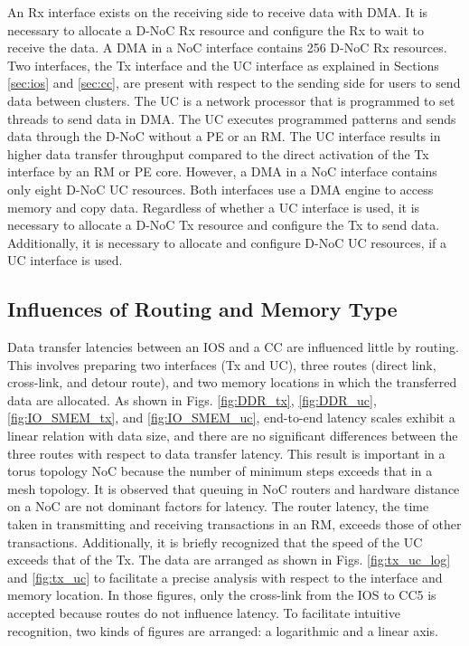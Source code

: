 An Rx interface exists on the receiving side to receive data with DMA.
It is necessary to allocate a D-NoC Rx resource and configure the Rx to wait to receive the data.
A DMA in a NoC interface contains 256 D-NoC Rx resources.
Two interfaces, the Tx interface and the UC interface as explained in Sections \ref{sec:ios} and \ref{sec:cc},
are present with respect to the sending side for users to send data between clusters.
The UC is a network processor that is programmed to set threads to send data in DMA.
The UC executes programmed patterns and sends data through the D-NoC without a PE or an RM.
The UC interface results in higher data transfer throughput compared to the direct activation of the Tx interface by an RM or PE core.
However, a DMA in a NoC interface contains only eight D-NoC UC resources.
Both interfaces use a DMA engine to access memory and copy data.
Regardless of whether a UC interface is used, it is necessary to allocate a D-NoC Tx resource and configure the Tx to send data.
Additionally, it is necessary to allocate and configure D-NoC UC resources, if a UC interface is used.

\subsection{Influences of Routing and Memory Type}
\label{sec:routing_and_memory}

Data transfer latencies between an IOS and a CC are influenced little by routing.
This involves preparing two interfaces (Tx and UC), three routes (direct link, cross-link, and detour route), and two memory locations in which the transferred data are allocated.
As shown in Figs. \ref{fig:DDR_tx}, \ref{fig:DDR_uc}, \ref{fig:IO_SMEM_tx}, and \ref{fig:IO_SMEM_uc}, 
end-to-end latency scales exhibit a linear relation with data size, and there are no significant differences between the three routes with respect to data transfer latency.
This result is important in a torus topology NoC because the number of minimum steps exceeds that in a mesh topology. 
It is observed that queuing in NoC routers and hardware distance on a NoC are not dominant factors for latency.
The router latency, the time taken in transmitting and receiving transactions in an RM, exceeds those of other transactions.
Additionally, it is briefly recognized that the speed of the UC exceeds that of the Tx.
The data are arranged as shown in Figs. \ref{fig:tx_uc_log} and \ref{fig:tx_uc} to facilitate a precise analysis with respect to the interface and memory location.
In those figures, only the cross-link from the IOS to CC5 is accepted because routes do not influence latency.
To facilitate intuitive recognition, two kinds of figures are arranged: a logarithmic and a linear axis.

